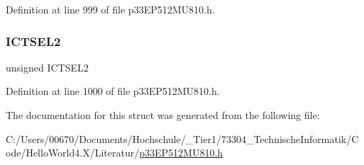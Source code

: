 Definition at line 999 of file p33\+E\+P512\+M\+U810.\+h.

\mbox{\label{structtag_i_c9_c_o_n1_b_i_t_s_a47d80892d449e6edbd5ba2ba9ff06deb}} 
\subsubsection{\texorpdfstring{I\+C\+T\+S\+E\+L2}{ICTSEL2}}
{\footnotesize\ttfamily unsigned I\+C\+T\+S\+E\+L2}



Definition at line 1000 of file p33\+E\+P512\+M\+U810.\+h.



The documentation for this struct was generated from the following file\+:\begin{DoxyCompactItemize}
\item 
C\+:/\+Users/00670/\+Documents/\+Hochschule/\+\_\+\+Tier1/73304\+\_\+\+Technische\+Informatik/\+Code/\+Hello\+World4.\+X/\+Literatur/\hyperlink{p33_e_p512_m_u810_8h}{p33\+E\+P512\+M\+U810.\+h}\end{DoxyCompactItemize}
